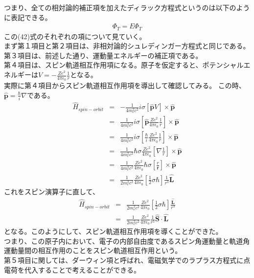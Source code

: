 \documentclass[10pt]{jreport}
\begin{document}
つまり、全ての相対論的補正項を加えたディラック方程式というのは以下のように表記できる。
\begin{eqnarray}
[\frac{\hat{\textbf{p}}^2}{2m_e}+V-\frac{\hat{\textbf{p}}^4}{8m_e^3c^2}-\frac{\hbar \sigma(\nabla\cdot V \times\hat{\textbf{p}})}{4m_e^2c^2}+\frac{\hbar^2}{8m_e^2c^2}\Delta V]\Phi_T = E\Phi_T
\end{eqnarray}
この(42)式のそれぞれの項について見ていく。\\
まず第１項目と第２項目は、非相対論的シュレディンガー方程式と同じである。\\
第３項目は、前述した通り、運動量エネルギーの補正項である。\\
第４項目は、スピン軌道相互作用項になる。原子を仮定すると、ポテンシャルエネルギーは$V=-\frac{Ze^2}{4\pi\epsilon_0}\frac{1}{r}$となる。\\
実際に第４項目からスピン軌道相互作用項を導出して確認してみる。
この時、$\hat{\textbf{p}}=\frac{\hbar}{i}\nabla$である。
\begin{eqnarray}
\hat{H}_{spin-orbit} &=& -\frac{1}{4m_e^2 c^2}i\sigma[\hat{\textbf{p}}V]\times\hat{\textbf{p}} \nonumber \\
&=& \frac{1}{4m_e^2c^2}i\sigma[\hat{\textbf{p}}\frac{Ze^2}{4\pi\epsilon_0}\frac{1}{r}]\times\hat{\textbf{p}} \nonumber \\
&=& \frac{1}{4m_e^2c^2}i\sigma[\frac{\hbar}{i}\frac{Ze^2}{4\pi\epsilon_0}\frac{1}{r}]\times\hat{\textbf{p}} \nonumber \\
&=&\frac{1}{4m_e^2c^2}\hbar\sigma\frac{Ze^2}{4\pi\epsilon_0}[\nabla\frac{1}{r}]\times\hat{\textbf{p}} \nonumber \\
&=&\frac{1}{4m_e^2c^2} \frac{Ze^2}{4\pi\epsilon_0}\hbar\sigma[\frac{r}{\textbf{r}}]\times\hat{\textbf{p}} \nonumber \\
&=& \frac{1}{2m_e^2c^2} \frac{Ze^2}{4\pi\epsilon_0}[\frac{1}{2}\sigma \hbar]\frac{1}{r^3}\hat{\textbf{L}}
\end{eqnarray}
これをスピン演算子に直して、
\begin{eqnarray}
\hat{H}_{spin-orbit} &=&  \frac{1}{2m_e^2c^2} \frac{Ze^2}{4\pi\epsilon_0}[\frac{1}{2}\sigma\hbar]\frac{\hat{\textbf{L}}}{r^3} \nonumber \\
&=& \frac{1}{2m_e^2c^2} \frac{Ze^2}{4\pi\epsilon_0}\frac{1}{r^3}\hat{\textbf{S}}\cdot\hat{\textbf{L}}
\end{eqnarray}
となる。このようにして、スピン軌道相互作用項を導くことができた。\\
つまり、この原子内において、電子の内部自由度であるスピン角運動量と軌道角運動量間の相互作用のことをスピン軌道相互作用という。\\

第５項目に関しては、ダーウィン項と呼ばれ、電磁気学でのラプラス方程式に点電荷を代入することで考えることができる。
\end{document}
